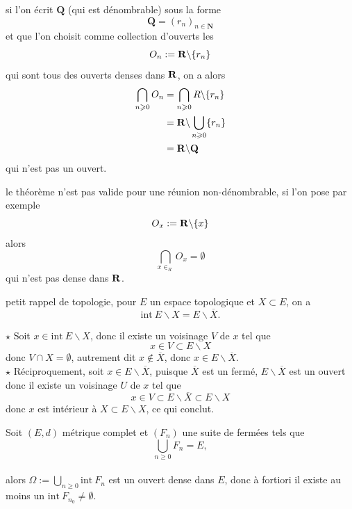 \documentclass[a4paper,11pt, twoside]{article}
\begin{document}
\begin{RQ}
  si l'on écrit $\mathbf Q$ (qui est dénombrable) sous la forme 
  $$\mathbf Q=\left(r_n\right)_{n\in\mathbf N}$$
  et que l'on choisit comme collection d'ouverts les 
  $$O_n:=\mathbf R\backslash \{r_n\}$$
  qui sont tous des ouverts denses dans $\mathbf R$, on a alors
  \begin{align*}
    \bigcap_{n\geqslant 0}O_n&=\bigcap_{n\geqslant 0}R\backslash \{r_n\}\\
    &=\mathbf R\backslash \bigcup_{n\geqslant 0}\{r_n\}\\
    &=\mathbf R\backslash \mathbf Q
  \end{align*}
  qui n'est pas un ouvert.
\end{RQ}


\begin{RQ} 
  le théorème n'est pas valide pour une réunion non-dénombrable, si l'on pose par exemple
  $$O_x:=\mathbf R\backslash \{x\}$$
  alors 
  $$\bigcap_{x\in_R}O_x=\emptyset$$
  qui n'est pas dense dans $\mathbf R$.
\end{RQ}

\begin{RQ}
  petit rappel de topologie, pour $E$ un espace topologique et $X\subset E$, on a 
  $$\mathrm{int}\ E\backslash X = E\backslash \overline{X}.$$
\end{RQ}


\begin{Proof}
  $\star$ Soit $x\in\mathrm{int}\ E\backslash X$, donc il existe un voisinage $V$ de $x$ tel que 
  $$x\in V\subset E\backslash X$$
  donc $V\cap X=\emptyset$, autrement dit $x\notin \overline X$, donc $x\in E\backslash \overline{X}$.\\

  $\star$ Réciproquement, soit $x\in E\backslash \overline{X}$, puisque $\overline X$ est un fermé, $E\backslash\overline X$ est un ouvert donc il existe un voisinage $U$ de $x$ tel que 
  $$x\in V\subset E\backslash\overline X\subset E\backslash X$$
  donc $x$ est intérieur à $X\subset E\backslash X$, ce qui conclut.
\end{Proof}


\begin{corollaire}
  Soit $(E,d)$ métrique complet et $\left(F_n\right)$ une suite de fermées tels que 
  $$\bigcup_{n\geqslant 0}F_n=E,$$\\

  alors $\Omega:=\bigcup_{n\geqslant 0}\mathrm{int}\ F_n$ est un ouvert dense dans $E$, donc à fortiori il existe au moins un $\mathrm{int}\ {F_{n_0}}\neq\emptyset$.
\end{corollaire}
\end{document}
